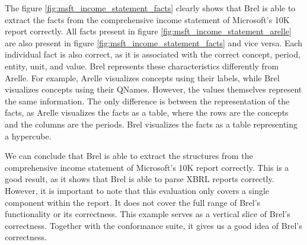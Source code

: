 The figure \ref{fig:msft_income_statement_facts} clearly shows that Brel is able to extract the facts from the comprehensive income statement of Microsoft's 10K report correctly.
All facts present in figure \ref{fig:msft_income_statement_arelle} are also present in figure \ref{fig:msft_income_statement_facts} and vice versa.
Each individual fact is also correct, as it is associated with the correct concept, period, entity, unit, and value.
Brel represents these characteristics differently from Arelle.
For example, Arelle visualizes concepts using their labels, while Brel visualizes concepts using their QNames.
However, the values themselves represent the same information.
The only difference is between the representation of the facts, as Arelle visualizes the facts as a table, where the rows are the concepts and the columns are the periods.
Brel visualizes the facts as a table representing a hypercube.

We can conclude that Brel is able to extract the structures from the comprehensive income statement of Microsoft's 10K report correctly.
This is a good result, as it shows that Brel is able to parse XBRL reports correctly.
However, it is important to note that this evaluation only covers a single component within the report.
It does not cover the full range of Brel's functionality or its correctness.
This example serves as a vertical slice of Brel's correctness.
Together with the conformance suite, it gives us a good idea of Brel's correctness.
